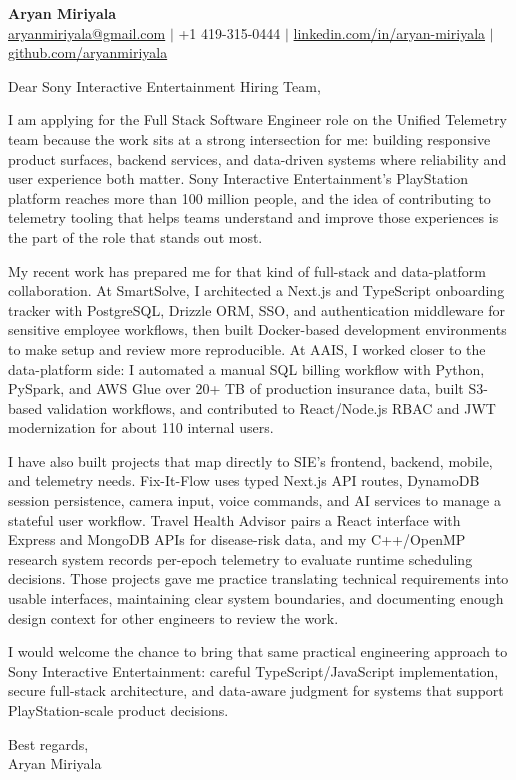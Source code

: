 \documentclass[11pt]{letter}
\begin{document}
\begin{center}
{\Large \textbf{Aryan Miriyala}}\\
\href{mailto:aryanmiriyala@gmail.com}{aryanmiriyala@gmail.com} $|$ +1 419-315-0444 $|$
\href{https://www.linkedin.com/in/aryan-miriyala-7788a21b6/}{linkedin.com/in/aryan-miriyala} $|$
\href{https://github.com/aryanmiriyala}{github.com/aryanmiriyala}
\end{center}

\vspace{0.18in}

Dear Sony Interactive Entertainment Hiring Team,

I am applying for the Full Stack Software Engineer role on the Unified Telemetry team because the work sits at a strong intersection for me: building responsive product surfaces, backend services, and data-driven systems where reliability and user experience both matter. Sony Interactive Entertainment's PlayStation platform reaches more than 100 million people, and the idea of contributing to telemetry tooling that helps teams understand and improve those experiences is the part of the role that stands out most.

My recent work has prepared me for that kind of full-stack and data-platform collaboration. At SmartSolve, I architected a Next.js and TypeScript onboarding tracker with PostgreSQL, Drizzle ORM, SSO, and authentication middleware for sensitive employee workflows, then built Docker-based development environments to make setup and review more reproducible. At AAIS, I worked closer to the data-platform side: I automated a manual SQL billing workflow with Python, PySpark, and AWS Glue over 20+ TB of production insurance data, built S3-based validation workflows, and contributed to React/Node.js RBAC and JWT modernization for about 110 internal users.

I have also built projects that map directly to SIE's frontend, backend, mobile, and telemetry needs. Fix-It-Flow uses typed Next.js API routes, DynamoDB session persistence, camera input, voice commands, and AI services to manage a stateful user workflow. Travel Health Advisor pairs a React interface with Express and MongoDB APIs for disease-risk data, and my C++/OpenMP research system records per-epoch telemetry to evaluate runtime scheduling decisions. Those projects gave me practice translating technical requirements into usable interfaces, maintaining clear system boundaries, and documenting enough design context for other engineers to review the work.

I would welcome the chance to bring that same practical engineering approach to Sony Interactive Entertainment: careful TypeScript/JavaScript implementation, secure full-stack architecture, and data-aware judgment for systems that support PlayStation-scale product decisions.

\vspace{0.12in}

Best regards,\\
Aryan Miriyala
\end{document}
